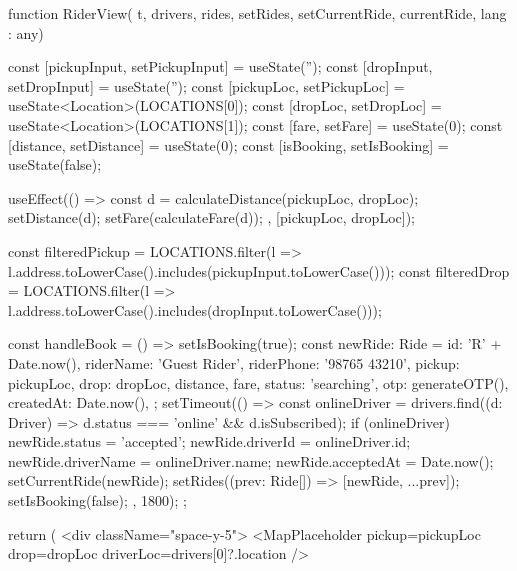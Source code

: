 function RiderView({ t, drivers, rides, setRides, setCurrentRide, currentRide, lang }: any) {
  const [pickupInput, setPickupInput] = useState('');
  const [dropInput, setDropInput] = useState('');
  const [pickupLoc, setPickupLoc] = useState<Location>(LOCATIONS[0]);
  const [dropLoc, setDropLoc] = useState<Location>(LOCATIONS[1]);
  const [fare, setFare] = useState(0);
  const [distance, setDistance] = useState(0);
  const [isBooking, setIsBooking] = useState(false);

  useEffect(() => {
    const d = calculateDistance(pickupLoc, dropLoc);
    setDistance(d);
    setFare(calculateFare(d));
  }, [pickupLoc, dropLoc]);

  const filteredPickup = LOCATIONS.filter(l => l.address.toLowerCase().includes(pickupInput.toLowerCase()));
  const filteredDrop = LOCATIONS.filter(l => l.address.toLowerCase().includes(dropInput.toLowerCase()));

  const handleBook = () => {
    setIsBooking(true);
    const newRide: Ride = {
      id: 'R' + Date.now(),
      riderName: 'Guest Rider',
      riderPhone: '98765 43210',
      pickup: pickupLoc,
      drop: dropLoc,
      distance,
      fare,
      status: 'searching',
      otp: generateOTP(),
      createdAt: Date.now(),
    };
    setTimeout(() => {
      const onlineDriver = drivers.find((d: Driver) => d.status === 'online' && d.isSubscribed);
      if (onlineDriver) {
        newRide.status = 'accepted';
        newRide.driverId = onlineDriver.id;
        newRide.driverName = onlineDriver.name;
        newRide.acceptedAt = Date.now();
      }
      setCurrentRide(newRide);
      setRides((prev: Ride[]) => [newRide, ...prev]);
      setIsBooking(false);
    }, 1800);
  };

  return (
    <div className="space-y-5">
      <MapPlaceholder pickup={pickupLoc} drop={dropLoc} driverLoc={drivers[0]?.location} />

}

